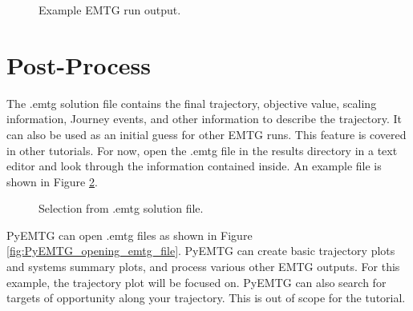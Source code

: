 \documentclass[11pt]{article}
\begin{document}
\begin{figure}[H]
	\centering
	\caption{\label{fig:example_output}Example \ac{EMTG} run output.}
\end{figure}

\section{Post-Process}
\label{sec:rpost_process}

The .emtg solution file contains the final trajectory, objective value, scaling information, Journey events, and other information to describe the trajectory. It can also be used as an initial guess for other \ac{EMTG} runs. This feature is covered in other tutorials. For now, open the .emtg file in the results directory in a text editor and look through the information contained inside. An example file is shown in Figure \ref{fig:emtg_output_file}.

\begin{figure}[H]
	\centering
	\caption{\label{fig:emtg_output_file}Selection from .emtg solution file.}
\end{figure}

\noindent PyEMTG can open .emtg files as shown in Figure \ref{fig:PyEMTG_opening_emtg_file}. PyEMTG can create basic trajectory plots and systems summary plots, and process various other \ac{EMTG} outputs. For this example, the trajectory plot will be focused on. PyEMTG can also search for targets of opportunity along your trajectory. This is out of scope for the tutorial.
\end{document}
